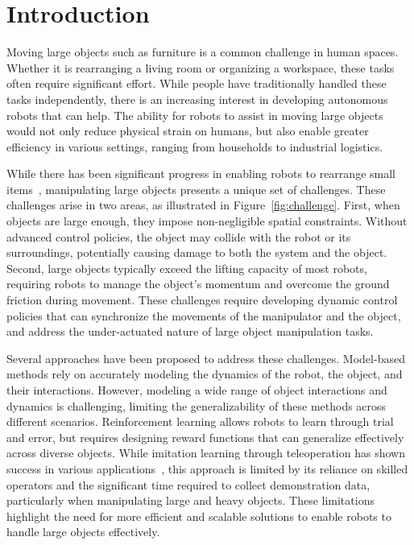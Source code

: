 \section{Introduction}
\label{sec:introduction}

Moving large objects such as furniture is a common challenge in human spaces. Whether it is rearranging a living room or organizing a workspace, these tasks often require significant effort. While people have traditionally handled these tasks independently, there is an increasing interest in developing autonomous robots that can help. The ability for robots to assist in moving large objects would not only reduce physical strain on humans, but also enable greater efficiency in various settings, ranging from households to industrial logistics.   



While there has been significant progress in enabling robots to rearrange small items~\citep{SayCan, chi2023diffusion, black2024pi_0, team2024octo}, manipulating large objects presents a unique set of challenges. These challenges arise in two areas, as illustrated in Figure~\ref{fig:challenge}. First, when objects are large enough, they impose non-negligible spatial constraints. Without advanced control policies, the object may collide with the robot or its surroundings, potentially causing damage to both the system and the object. Second, large objects typically exceed the lifting capacity of most robots, requiring robots to manage the object's momentum and overcome the ground friction during movement. These challenges require developing dynamic control policies that can synchronize the movements of the manipulator and the object, and address the under-actuated nature of large object manipulation tasks. 



Several approaches have been proposed to address these challenges. Model-based methods rely on accurately modeling the dynamics of the robot, the object, and their interactions. 
However, modeling a wide range of object interactions and dynamics is challenging, limiting the generalizability of these methods across different scenarios. 
Reinforcement learning allows robots to learn through trial and error, but requires designing reward functions that can generalize effectively across diverse objects. While imitation learning through teleoperation has shown success in various applications~\citep{RoboImitationPeng20, MobileAloha, lu2024mobile}, this approach is limited by its reliance on skilled operators and the significant time required to collect demonstration data, particularly when manipulating large and heavy objects. These limitations highlight the need for more efficient and scalable solutions to enable robots to handle large objects effectively.



